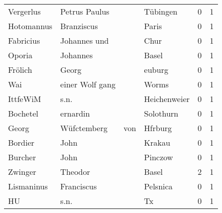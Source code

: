 \begin{tabular}{llllrr}
                Vergerlus &                      Petrus Paulus &             &                                    Tübingen &          0 &         1 \\
               Hotomannus &                         Branziscus &             &                                       Paris &          0 &         1 \\
                Fabricius &                       Johannes und &             &                                        Chur &          0 &         1 \\
                   Oporia &                           Johannes &             &                                       Basel &          0 &         1 \\
                  Frölich &                              Georg &             &                                      euburg &          0 &         1 \\
                      Wai &                    einer Wolf gang &             &                                       Worms &          0 &         1 \\
                 IttfeWiM &                               s.n. &             &                                Heichenweier &          0 &         1 \\
                 Bochetel &                           ernardin &             &                                   Solothurn &          0 &         1 \\
                    Georg &                        Wüfctemberg &         von &                                     Hfrburg &          0 &         1 \\
                  Bordier &                               John &             &                                      Krakau &          0 &         1 \\
                  Burcher &                               John &             &                                     Pinczow &          0 &         1 \\
                  Zwinger &                            Theodor &             &                                       Basel &          2 &         1 \\
               Lismaninus &                         Franciscus &             &                                    Pelsnica &          0 &         1 \\
                       HU &                               s.n. &             &                                          Tx &          0 &         1 \\

\end{tabular}
